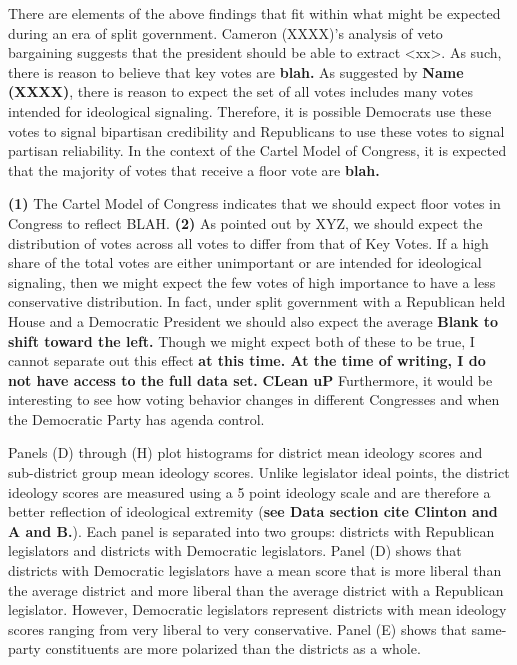 \documentclass[10pt,letterpaper]{article}
\begin{document}
There are elements of the above findings that fit within what might be expected during an era of split government. Cameron (XXXX)'s analysis of veto bargaining suggests that the president should be able to extract <xx>. As such, there is reason to believe that key votes are \textbf{blah.} As suggested by \textbf{Name (XXXX)}, there is reason to expect the set of all votes includes many votes intended for ideological signaling. Therefore, it is possible Democrats use these votes to signal bipartisan credibility and Republicans to use these votes to signal partisan reliability. In the context of the Cartel Model of Congress, it is expected that the majority of votes that receive a floor vote are \textbf{blah.}


\textbf{(1)} The Cartel Model of Congress indicates that we should expect floor votes in Congress to reflect BLAH. \textbf{(2)} As pointed out by XYZ, we should expect the distribution of votes across all votes to differ from that of Key Votes. If a high share of the total votes are either unimportant or are intended for ideological signaling, then we might expect the few votes of high importance to have a less conservative distribution. In fact, under split government with a Republican held House and a Democratic President we should also expect the average \textbf{Blank to shift toward the left.} Though we might expect both of these to be true, I cannot separate out this effect \textbf{at this time. At the time of writing, I do not have access to the full data set.} \textbf{CLean uP} Furthermore, it would be interesting to see how voting behavior changes in different Congresses and when the Democratic Party has agenda control.

Panels (D) through (H) plot histograms for district mean ideology scores and sub-district group mean ideology scores. Unlike legislator ideal points, the district ideology scores are measured using a 5 point ideology scale and are therefore a better reflection of ideological extremity (\textbf{see Data section cite Clinton and A and B.}). Each panel is separated into two groups: districts with Republican legislators and districts with Democratic legislators. Panel (D) shows that districts with Democratic legislators have a mean score that is more liberal than the average district and more liberal than the average district with a Republican legislator. However, Democratic legislators represent districts with mean ideology scores ranging from very liberal to very conservative. Panel (E) shows that same-party constituents are more polarized than the districts as a whole. 
\end{document}
